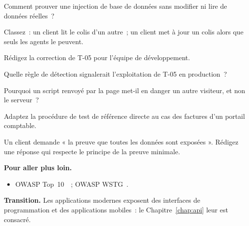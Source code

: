 \begin{boxexo}[title={\ding{45}\quad Exercice~15.4. Preuve inoffensive \niveaumoyen}]
Comment prouver une injection de base de données sans modifier ni lire de
données réelles~?
\end{boxexo}

\begin{boxexo}[title={\ding{45}\quad Exercice~15.5. Horizontal ou vertical \niveaumoyen}]
Classez~: un client lit le colis d'un autre~; un client met à jour un colis
alors que seuls les agents le peuvent.
\end{boxexo}

\begin{boxexo}[title={\ding{45}\quad Exercice~15.6. Correction \niveaumoyen}]
Rédigez la correction de T-05 pour l'équipe de développement.
\end{boxexo}

\begin{boxexo}[title={\ding{45}\quad Exercice~15.7. Détection \niveaumoyen}]
Quelle règle de détection signalerait l'exploitation de T-05 en
production~?
\end{boxexo}

\begin{boxexo}[title={\ding{45}\quad Exercice~15.8. Script \niveaumoyen}]
Pourquoi un script renvoyé par la page met-il en danger un autre visiteur,
et non le serveur~?
\end{boxexo}

\begin{boxexo}[title={\ding{45}\quad Exercice~15.9. Procédure \niveauexpert}]
Adaptez la procédure de test de référence directe au cas des factures d'un
portail comptable.
\end{boxexo}

\begin{boxexo}[title={\ding{45}\quad Exercice~15.10. Mandat \niveauexpert}]
Un client demande « la preuve que toutes les données sont exposées ».
Rédigez une réponse qui respecte le principe de la preuve minimale.
\end{boxexo}

\bigskip

\begin{boxinfo}
\textbf{Pour aller plus loin.}
\begin{itemize}
    \item OWASP Top~10~\cite{owasptop10}~; OWASP WSTG~\cite{owaspwstg}.
\end{itemize}
\end{boxinfo}

\begin{boxinfo}
\textbf{Transition.} Les applications modernes exposent des interfaces de
programmation et des applications mobiles~: le Chapitre~\ref{chap:api} leur
est consacré.
\end{boxinfo}

